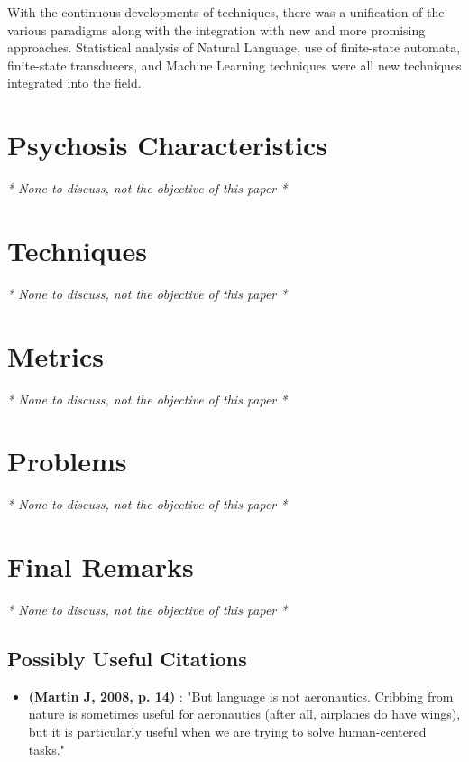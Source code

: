 \documentclass{Paper_Summary}
\begin{document}
    With the continuous developments of techniques, there was a unification of the various paradigms along with the integration with new and more promising approaches. Statistical analysis of Natural Language, use of finite-state automata, finite-state transducers, and Machine Learning techniques were all new techniques integrated into the field.

\breakline

\newpage

\section{Psychosis Characteristics}
    \emph{* None to discuss, not the objective of this paper *}

\section{Techniques}
    \emph{* None to discuss, not the objective of this paper *}

\section{Metrics}
    \emph{* None to discuss, not the objective of this paper *}

\section{Problems}
    \emph{* None to discuss, not the objective of this paper *}


\section{Final Remarks}
    \emph{* None to discuss, not the objective of this paper *}

\breakline

\begin{center}
    \section*{Possibly Useful Citations}
\end{center}

    \begin{itemize}
        \item \textbf{(Martin J, 2008, p. 14)} : "But language is not aeronautics. Cribbing from nature is sometimes useful for aeronautics (after all, airplanes do have wings), but it is particularly useful when we are trying to solve human-centered tasks."
    \end{itemize}
\end{document}

